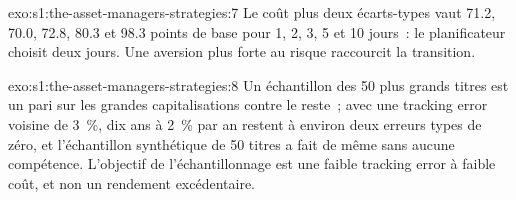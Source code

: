\begin{solution}{exo:s1:the-asset-managers-strategies:7}
Le coût plus deux écarts-types vaut 71.2, 70.0, 72.8, 80.3 et 98.3 points de base pour 1, 2, 3, 5 et 10 jours~: le planificateur choisit deux jours. Une
aversion plus forte au risque raccourcit la transition.
\end{solution}

\begin{solution}{exo:s1:the-asset-managers-strategies:8}
Un échantillon des 50 plus grands titres est un pari sur les grandes capitalisations contre le reste~; avec une tracking error voisine de 3~\%, dix ans à 2~\% par an restent à environ deux
erreurs types de zéro, et l'échantillon synthétique de 50 titres a fait de même sans aucune compétence. L'objectif de l'échantillonnage est une faible tracking error à faible coût, et non
un rendement excédentaire.
\end{solution}

